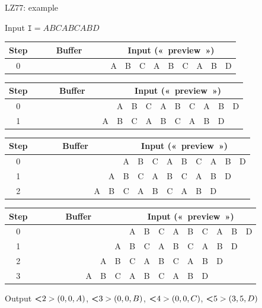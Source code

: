 \documentclass[10pt]{beamer}
\newcommand{\guill}[1]{«~#1~»}
\begin{document}
\begin{frame}{LZ77: example}
\begin{block}{Input}
$\texttt{I}=ABCABCABD$
\end{block}

\bigskip

 {
\begin{tabular}{|c|c|c|c|c|c|c|c|c|c|c|c|c|c|c|c|c|c|c|}
\hline
\textbf{Step}&\multicolumn{9}{|c|}{\textbf{Buffer}} & \multicolumn{9}{|c|}{\textbf{Input} (\guill{preview})} \\
\hline
0&&&&&&&&&&A&B&C&A&B&C&A&B&D\\
\hline
\end{tabular}}

 {
\begin{tabular}{|c|c|c|c|c|c|c|c|c|c|c|c|c|c|c|c|c|c|c|}
\hline
\textbf{Step}&\multicolumn{9}{|c|}{\textbf{Buffer}} & \multicolumn{9}{|c|}{\textbf{Input} (\guill{preview})} \\
\hline
0&&&&&&&&&&A&B&C&A&B&C&A&B&D\\
\hline
1&&&&&&&&&A&B&C&A&B&C&A&B&D&\\
\hline
\end{tabular}}

 {
\begin{tabular}{|c|c|c|c|c|c|c|c|c|c|c|c|c|c|c|c|c|c|c|}
\hline
\textbf{Step}&\multicolumn{9}{|c|}{\textbf{Buffer}} & \multicolumn{9}{|c|}{\textbf{Input} (\guill{preview})} \\
\hline
0&&&&&&&&&&A&B&C&A&B&C&A&B&D\\
\hline
1&&&&&&&&&A&B&C&A&B&C&A&B&D&\\
\hline
2&&&&&&&&A&B&C&A&B&C&A&B&D&&\\
\hline
\end{tabular}}

 {
\begin{tabular}{|c|c|c|c|c|c|c|c|c|c|c|c|c|c|c|c|c|c|c|}
\hline
\textbf{Step}&\multicolumn{9}{|c|}{\textbf{Buffer}} & \multicolumn{9}{|c|}{\textbf{Input} (\guill{preview})} \\
\hline
0&&&&&&&&&&A&B&C&A&B&C&A&B&D\\
\hline
1&&&&&&&&&A&B&C&A&B&C&A&B&D&\\
\hline
2&&&&&&&&A&B&C&A&B&C&A&B&D&&\\
\hline
3&&&&&&&A&B&C&A&B&C&A&B&D&&&\\
\hline
\end{tabular}}

\bigskip

\begin{block}{Output}
$\textbf<2>{(0,0,A)}$,
$\textbf<3>{(0,0,B)}$,
$\textbf<4>{(0,0,C)}$,
$\textbf<5>{(3,5,D)}$
\end{block}
\end{frame}
\end{document}
